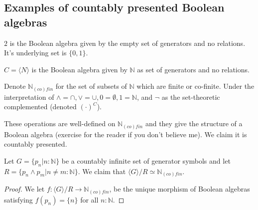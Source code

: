 \documentclass{../util/zariski-small}
\begin{document}
\subsection{Examples of countably presented Boolean algebras}
\begin{example}
  $2$ is the Boolean algebra given by the empty set of generators and no relations. 
    It's underlying set is $\{0,1\}$. 
\end{example}
\begin{example}
  $C = \langle N \rangle $ is the Boolean algebra given by $\mathbb N$ as set of generators and no relations. 
\end{example}
\begin{example}
  Denote $\mathbb N_{(co)fin}$ for the set of subsets of $\mathbb N$ which are finite or co-finite. 
  Under the interpretation of $\wedge = \cap , \vee = \cup, 0 = \emptyset, 1 = \mathbb N$, and $\neg$ 
  as the set-theoretic complemented (denoted $(\cdot)^C$). 

  These operations are well-defined on $\mathbb N_{(co)fin}$ 
  and they give the structure of a Boolean algebra (exercise for the reader if you don't believe me). 
  We claim it is countably presented. 

  Let $G = \{p_n| n:\mathbb N\} $ be a countably infinite set of generator symbols and let 
  $R = \{ p_n \wedge p_m | n\neq m :\mathbb N \}$. 
  We claim that $\langle G \rangle / R \simeq \mathbb N_{(co)fin}$. 

\begin{proof}
  We let $f:\langle G \rangle / R \to \mathbb N_{(co)fin}$, be the unique morphism of Boolean algebras 
  satisfying $f(p_n) = \{n\}$ for all $n:\mathbb N$.


\end{proof}
\end{example}
\end{document}

